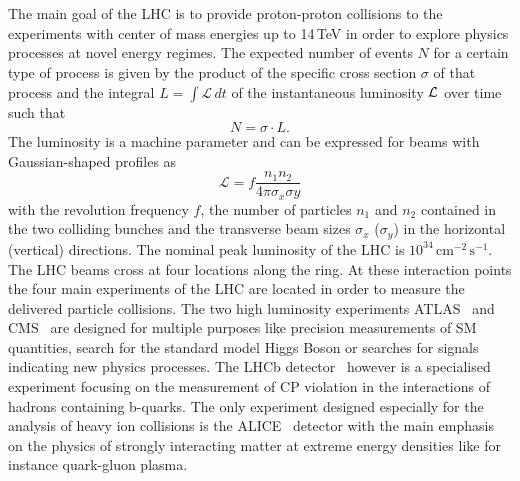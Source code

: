 \\
\\
The main goal of the LHC is to provide proton-proton collisions to the experiments with center of mass energies up to 14\,TeV in order to explore physics processes at novel energy regimes. The expected number of events $N$ for a certain type of process is given by the product of the specific cross section $\sigma$ of that process and the integral $L = \int \mathcal{L}  \, dt$ of the instantaneous luminosity $\cal L$ over time such that
\begin{equation}
  N = \sigma \cdot L . 
  \label{eq:lumi}
\end{equation}
The luminosity is a machine parameter and can be expressed for beams with Gaussian-shaped profiles as  
\begin{equation}
  \mathcal{L} = f \frac{n_{1}n_{2}}{4 \pi \sigma_{x} \sigma{y}}
  \label{eq:lumi}
\end{equation}
with the revolution frequency $f$, the number of particles $n_1$ and $n_2$ contained in the two colliding bunches and the transverse beam sizes $\sigma_{x}$ ($\sigma_{y}$) in the horizontal (vertical) directions. The nominal peak luminosity of the LHC is $10^{34} \, \mathrm{cm}^{-2} \, \mathrm{s}^{-1}$.\\
The LHC beams cross at four locations along the ring. At these interaction points the four main experiments of the LHC are located in order to measure the delivered particle collisions. The two high luminosity experiments ATLAS~\cite{det::ATLAS} and CMS~\cite{Chatrchyan:2008zzk, bib:cmsptdr1} are designed for multiple purposes like precision measurements of SM quantities, search for the standard model Higgs Boson or searches for signals indicating new physics processes. The LHCb detector~\cite{det::LHCb} however is a specialised experiment focusing on the measurement of CP violation in the interactions of hadrons containing b-quarks. The only experiment designed especially for the analysis of heavy ion collisions is the ALICE~\cite{det::ALICE} detector with the main emphasis on the physics of strongly interacting matter at extreme energy densities like for instance quark-gluon plasma.

